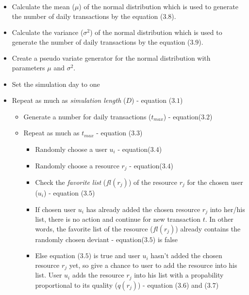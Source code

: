 \documentclass[12pt,a4paper]{report}
\begin{document}
\begin{itemize}

\item Calculate the mean ($\mu$) of the normal distribution which is used to generate the number of daily transactions by the equation ($3.8$).

\item Calculate the variance ($\sigma^2$) of the normal distribution which is used to generate the number of daily transactions by the equation ($3.9$).

\item Create a pseudo variate generator for the normal distribution with parameters $\mu$ and $\sigma^2$.

\item Set the simulation day to one

\item Repeat as much as \emph{simulation length} ($D$) - equation ($3.1$)

	\begin{itemize}

	\item Generate a number for daily transactions ($t_{max}$) - equation($3.2$)

	\item Repeat as much as $t_{max}$ - equation ($3.3$)

		\begin{itemize}

		\item Randomly choose a user $u_{i}$ - equation($3.4$)

		\item Randomly choose a resource $r_{j}$ - equation($3.4$) 

		\item Check the \emph{favorite list} ($fl(r_{j})$) of the resource $r_{j}$ for the chosen user ($u_{i}$) - equation ($3.5$)

		\item If chosen user $u_{i}$ has already added the chosen resource $r_{j}$ into her/his list, there is no action and continue for new transaction $t$. In other words, the {favorite list} of the resource ($fl(r_{j})$)  already contains the randomly chosen deviant - equation($3.5$) is false

		\item Else equation ($3.5$) is true and user $u_{i}$ hasn't added the chosen resource $r_{j}$ yet, so give a chance to user to add the resource into his list. User $u_{i}$ adds the resource $r_{j}$ into his list with a propability proportional to its quality ($q(r_{j})$) - equation ($3.6$) and ($3.7$)


\end{itemize}
\end{itemize}
\end{itemize}
\end{document}
